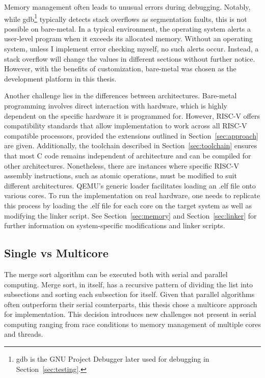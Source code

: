 Memory management often leads to unusual errors during debugging. Notably, while
gdb\footnote{gdb is the GNU Project Debugger later used for debugging in
Section~\ref{sec:testing}.} typically detects stack overflows as segmentation
faults, this is not possible on bare-metal. In a typical environment, the
operating system alerts a user-level program when it exceeds its allocated
memory. Without an operating system, unless I implement error checking myself,
no such alerts occur. Instead, a stack overflow will change the values in
different sections without further notice. However, with the benefits of
customization, bare-metal was chosen as the development platform in this thesis.

Another challenge lies in the differences between architectures. Bare-metal
programming involves direct interaction with hardware, which is highly dependent
on the specific hardware it is programmed for. However, RISC-V offers
compatibility standards that allow implementation to work across all RISC-V
compatible processors, provided the extensions outlined in
Section~\ref{sec:approach} are given. Additionally, the toolchain described in
Section~\ref{sec:toolchain} ensures that most C code remains independent of
architecture and can be compiled for other architectures. Nonetheless, there are
instances where specific RISC-V assembly instructions, such as atomic
operations, must be modified to suit different architectures. QEMU's generic
loader facilitates loading an .elf file onto various cores. To run the
implementation on real hardware, one needs to replicate this process by loading
the .elf file for each core on the target system as well as modifying the linker
script. See Section~\ref{sec:memory} and Section~\ref{sec:linker} for further
information on system-specific modifications and linker scripts.

\subsection{Single vs Multicore}\label{sec:singlevsmulti}
The merge sort algorithm can be executed both with serial and parallel
computing. Merge sort, in itself, has a recursive pattern of dividing the list
into subsections and sorting each subsection for itself. Given that parallel
algorithms often outperform their serial counterparts, this thesis chose a
multicore approach for implementation\cite{comp_parallel}. This decision
introduces new challenges not present in serial computing ranging from race
conditions to memory management of multiple cores and threads.

